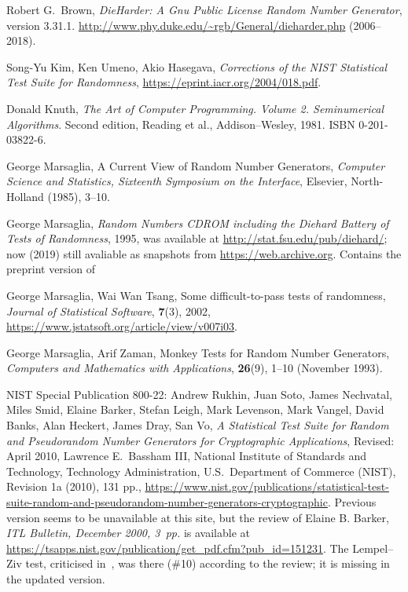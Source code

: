 \documentclass[12pt,a4paper,fullpage]{article}
\begin{document}
\begin{thebibliography}{9}

Robert G.~Brown, \emph{\textup{Die}Harder: \textup{A Gnu Public License Random Number Generator}}, version 3.31.1.  \url{http://www.phy.duke.edu/~rgb/General/dieharder.php} (2006--2018).

Song-Yu Kim, Ken Umeno, Akio Hasegava, \emph{Corrections of the NIST Statistical Test Suite for Randomness}, \url{https://eprint.iacr.org/2004/018.pdf}.

Donald Knuth, \emph{The Art of Computer Programming. Volume 2. Seminumerical Algorithms}. Second edition, Reading et al., Addison--Wesley, 1981. ISBN 0-201-03822-6.

George Marsaglia, A Current View of Random Number Generators, \emph{Computer Science and Statistics, Sixteenth Symposium on the Interface}, Elsevier, North-Holland (1985), 3--10.

George Marsaglia, \emph{Random Numbers CDROM including the Diehard Battery of Tests of Randomness}, 1995, was available at \url{http://stat.fsu.edu/pub/diehard/}; now (2019) still avaliable as snapshots from \url{https://web.archive.org}. Contains the preprint version of~\cite{marsaglia-zaman,marsaglia1985}

George Marsaglia, Wai Wan Tsang, Some difficult-to-pass tests of randomness, 
\emph{Journal of Statistical Software}, \textbf{7}(3), 2002, \url{https://www.jstatsoft.org/article/view/v007i03}.

George Marsaglia, Arif Zaman,  Monkey Tests for Random Number Generators, \emph{Computers and Mathematics with Applications}, \textbf{26}(9), 1--10 (November 1993).

NIST Special Publication 800-22:  Andrew Rukhin, Juan Soto, James Nechvatal, Miles Smid, Elaine Barker, Stefan Leigh, Mark Levenson, Mark Vangel, David Banks, Alan Heckert, James Dray, San Vo, \emph{A Statistical Test Suite for Random and Pseudorandom Number Generators for Cryptographic Applications}, Revised: April 2010, Lawrence E.~Bassham III,
National Institute of Standards and Technology, Technology Administration, U.S.~Department of Commerce (NIST),  Revision 1a (2010), 131 pp., {\scriptsize\url{https://www.nist.gov/publications/statistical-test-suite-random-and-pseudorandom-number-generators-cryptographic}}. Previous version seems to be unavailable at this site, but the review of Elaine B. Barker, \emph{ITL Bulletin, December 2000, 3~pp.} is available at \url{https://tsapps.nist.gov/publication/get_pdf.cfm?pub_id=151231}. The Lempel--Ziv test, criticised in~\cite{kim-umeno-hasegawa}, was there (\#10) according to the review; it is missing in the updated version.


\end{thebibliography}
\end{document}

